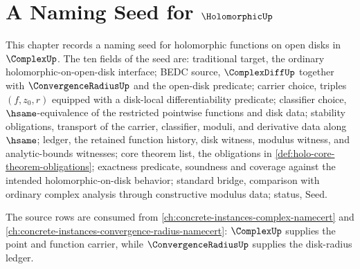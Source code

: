 \chapter{A Naming Seed for \texorpdfstring{$\HolomorphicUp$}{Holomorphic-up}}
\label{ch:concrete-instances-holomorphic-namecert}

This chapter records a naming seed for holomorphic functions on open disks in $\ComplexUp$. The ten fields of the seed are: traditional target, the ordinary holomorphic-on-open-disk interface; BEDC source, $\ComplexDiffUp$ together with $\ConvergenceRadiusUp$ and the open-disk predicate; carrier choice, triples $(f,z_0,r)$ equipped with a disk-local differentiability predicate; classifier choice, $\hsame$-equivalence of the restricted pointwise functions and disk data; stability obligations, transport of the carrier, classifier, moduli, and derivative data along $\hsame$; ledger, the retained function history, disk witness, modulus witness, and analytic-bounds witnesses; core theorem list, the obligations in \autoref{def:holo-core-theorem-obligations}; exactness predicate, soundness and coverage against the intended holomorphic-on-disk behavior; standard bridge, comparison with ordinary complex analysis through constructive modulus data; status, $\text{Seed}$.

The source rows are consumed from \autoref{ch:concrete-instances-complex-namecert} and \autoref{ch:concrete-instances-convergence-radius-namecert}: $\ComplexUp$ supplies the point and function carrier, while $\ConvergenceRadiusUp$ supplies the disk-radius ledger.




